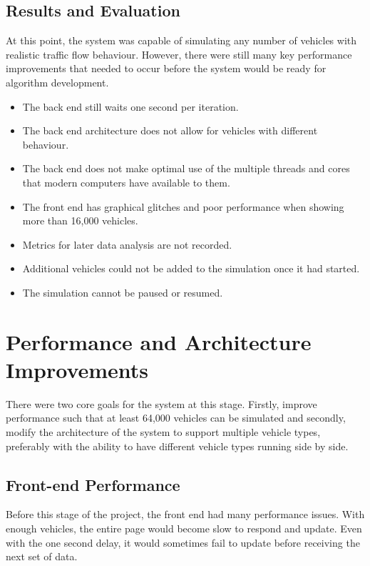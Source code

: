 \documentclass[ %
                    author={Alexander Hill},
                supervisor={Dr. Benjamin Sach},
                    degree={MEng},
                     title={MARMOSET},
                  subtitle={Multi-Agent Route Management using Online Simulation for Efficient Transportation},
                      type={research},
                      year={2016} ]{dissertation}
\begin{document}
\subsection{Results and Evaluation}

At this point, the system was capable of simulating any number of vehicles with
realistic traffic flow behaviour. However, there were still many key performance
improvements that needed to occur before the system would be ready for
algorithm development.

\begin{itemize}
    \item The back end still waits one second per iteration.
    \item The back end architecture does not allow for vehicles with different
        behaviour.
    \item The back end does not make optimal use of the multiple threads and
        cores that modern computers have available to them.
    \item The front end has graphical glitches and poor performance when
        showing more than 16,000 vehicles.
    \item Metrics for later data analysis are not recorded.
    \item Additional vehicles could not be added to the simulation once it had
        started.
    \item The simulation cannot be paused or resumed.
\end{itemize}

\section{Performance and Architecture Improvements}

There were two core goals for the system at this stage. Firstly, improve
performance such that at least 64,000 vehicles can be simulated and secondly,
modify the architecture of the system to support multiple vehicle types,
preferably with the ability to have different vehicle types running side by
side.

\subsection{Front-end Performance}

Before this stage of the project, the front end had many performance issues.
With enough vehicles, the entire page would become slow to respond and update.
Even with the one second delay, it would sometimes fail to update before
receiving the next set of data.
\end{document}
